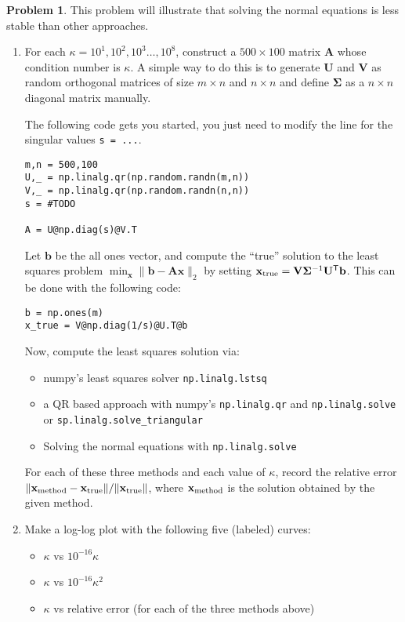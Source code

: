 \documentclass[12pt]{article}
\theoremstyle{definition}
\newtheorem{problem}{Problem}
\renewcommand{\vec}{\mathbf}
\newcommand{\T}{\mathsf{T}}
\begin{document}
\begin{problem}

This problem will illustrate that solving the normal equations is less stable than other approaches.

\begin{enumerate}
    \item 
    For each $\kappa = 10^1,10^2,10^3 \ldots, 10^8$, construct a $500\times 100$ matrix $\vec{A}$ whose condition number is $\kappa$.
        A simple way to do this is to generate $\vec{U}$ and $\vec{V}$ as random orthogonal matrices of size $m\times n$ and $n\times n$ and define $\vec{\Sigma}$ as a $n\times n$ diagonal matrix manually.
    
The following code gets you started, you just need to modify the line for the singular values \lstinline{s = ...}.
\begin{lstlisting}
m,n = 500,100
U,_ = np.linalg.qr(np.random.randn(m,n))
V,_ = np.linalg.qr(np.random.randn(n,n))
s = #TODO
    
A = U@np.diag(s)@V.T
\end{lstlisting}


        Let $\vec{b}$ be the all ones vector, and compute the ``true'' solution to the least squares problem $\min_{\vec{x}} \| \vec{b} - \vec{A} \vec{x}\|_2$  by setting 
    $\vec{x}_{\textup{true}} =  \vec{V} \vec{\Sigma}^{-1} \vec{U}^\T \vec{b}$.
This can be done with the following code:
\begin{lstlisting}
b = np.ones(m)
x_true = V@np.diag(1/s)@U.T@b
\end{lstlisting}


Now, compute the least squares solution via:
\begin{itemize}
    \item numpy's least squares solver \lstinline{np.linalg.lstsq}
    \item a QR based approach with numpy's \lstinline{np.linalg.qr} and \lstinline{np.linalg.solve} or \lstinline{sp.linalg.solve_triangular}
    \item Solving the normal equations with \lstinline{np.linalg.solve}
\end{itemize}

    For each of these three methods and each value of $\kappa$, record the relative error $\| \vec{x}_{\textup{method}} - \vec{x}_{\textup{true}} \| / \| \vec{x}_{\textup{true}} \|$, where $\vec{x}_{\textup{method}}$ is the solution obtained by the given method.

\item 
    Make a log-log plot with the following five (labeled) curves:
    \begin{itemize}
        \item $\kappa$ vs $10^{-16} \kappa$
        \item $\kappa$ vs $10^{-16} \kappa^2$
        \item $\kappa$ vs relative error (for each of the three methods above)
    \end{itemize}


\end{enumerate}
\end{problem}
\end{document}
